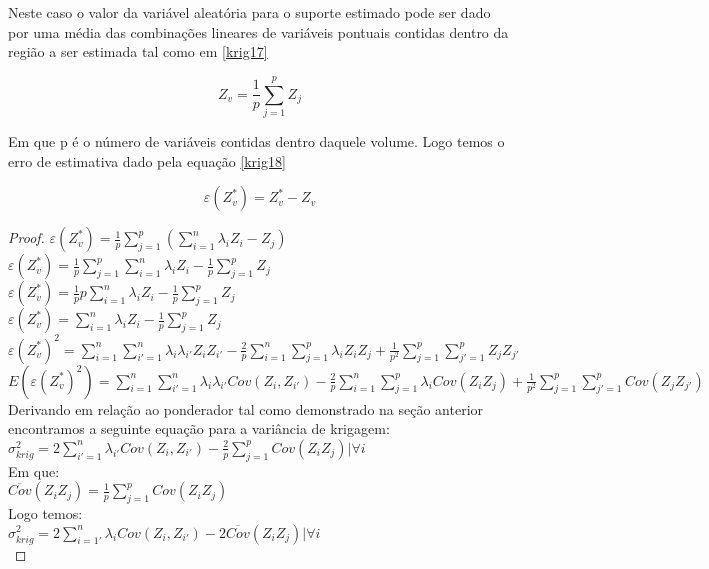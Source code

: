 Neste caso o valor da variável aleatória para o suporte estimado pode ser dado por uma média das combinações lineares de variáveis pontuais contidas dentro da região a ser estimada tal como em \eqref{krig17}

\begin{equation}\label{krig17}
Z_{v}  = \frac{1}{p}\sum_{j=1}^{p} Z_{j}
\end{equation}

Em que p é o número de variáveis contidas dentro daquele volume. Logo temos o erro de estimativa dado pela equação \eqref{krig18}

\begin{equation}\label{krig18}
\varepsilon (Z^{*}_{v}) = Z^{*} _{v} - Z_{v}
\end{equation}

\begin{proof}
	$\varepsilon (Z^{*}_{v}) = \frac{1}{p}\sum_{j=1}^{p}(\sum_{i=1}^{n}\lambda_{i}Z_{i} -  Z_{j}) $ \\
	$\varepsilon (Z^{*}_{v}) = \frac{1}{p}\sum_{j=1}^{p}\sum_{i=1}^{n}\lambda_{i}Z_{i} - \frac{1}{p}\sum_{j=1}^{p} Z_{j} $ \\
	$\varepsilon (Z^{*}_{v}) = \frac{1}{p}p\sum_{i=1}^{n}\lambda_{i}Z_{i} - \frac{1}{p}\sum_{j=1}^{p} Z_{j} $\\	
	$\varepsilon (Z^{*}_{v}) = \sum_{i=1}^{n}\lambda_{i}Z_{i} - \frac{1}{p}\sum_{j=1}^{p} Z_{j} $\\	
	$\varepsilon (Z^{*}_{v})^2 = \sum_{i=1}^{n}\sum_{i'=1}^{n}\lambda_{i}\lambda_{i'}Z_{i}Z_{i'} - \frac{2}{p}\sum_{i=1}^{n}\sum_{j=1}^{p}\lambda_{i}Z_{i}Z_{j}+ \frac{1}{p^2}\sum_{j=1}^{p}\sum_{j'=1}^{p} Z_{j}Z_{j'} $\\
	$E\left(\varepsilon (Z^{*}_{v})^2 \right) = \sum_{i=1}^{n}\sum_{i'=1}^{n}\lambda_{i}\lambda_{i'}Cov(Z_{i},Z_{i'}) - \frac{2}{p}\sum_{i=1}^{n}\sum_{j=1}^{p}\lambda_{i}Cov(Z_{i}Z_{j})+ \frac{1}{p^2}\sum_{j=1}^{p}\sum_{j'=1}^{p} Cov(Z_{j}Z_{j'}) $\\   
     Derivando em relação ao ponderador tal como demonstrado na seção anterior encontramos a seguinte equação para a variância de krigagem:    \\
     $\sigma^{2}_{krig} = 2\sum_{i'=1}^{n}\lambda_{i'}Cov(Z_{i},Z_{i'}) - \frac{2}{p}\sum_{j=1}^{p}Cov(Z_{i}Z_{j}) |\forall i $\\   
     Em que: \\    
     $\overline{Cov}(Z_{i}Z_{j}) = \frac{1}{p}\sum_{j=1}^{p}Cov(Z_{i}Z_{j})$\\
     Logo temos: \\
	 $\sigma^{2}_{krig} = 2\sum_{i=1'}^{n}\lambda_{i}Cov(Z_{i},Z_{i'}) - 2\overline{Cov}(Z_{i}Z_{j}) |\forall i $\\ 
	 
	 
\end{proof}

